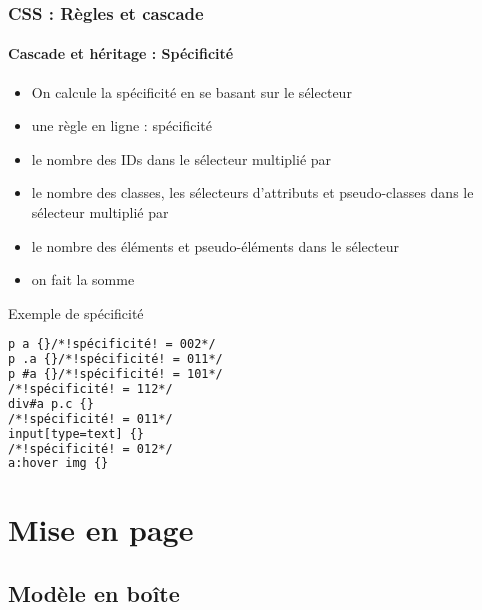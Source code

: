 \documentclass[xcolor=table]{beamer}
\begin{document}
\begin{frame}[fragile]
\frametitle{CSS : Règles et cascade}
\framesubtitle{Cascade et héritage : Spécificité}

\begin{minipage}{0.60\textwidth}
	\begin{itemize}
		\item On calcule la spécificité en se basant sur le sélecteur
		\item une règle en ligne : spécificité  
		\item le nombre des IDs dans le sélecteur multiplié par 
		\item le nombre des classes, les sélecteurs d'attributs et pseudo-classes dans le sélecteur multiplié par 
		\item le nombre des éléments et pseudo-éléments dans le sélecteur
		\item on fait la somme
	\end{itemize}
\end{minipage}
%
\begin{minipage}{0.38\textwidth}
\begin{exampleblock}{Exemple de spécificité}
\lstset{escapeinside=!!}
\scriptsize\bfseries
\begin{lstlisting}[language={html}]
p a {}/*!spécificité! = 002*/
p .a {}/*!spécificité! = 011*/
p #a {}/*!spécificité! = 101*/
/*!spécificité! = 112*/
div#a p.c {}
/*!spécificité! = 011*/
input[type=text] {}
/*!spécificité! = 012*/
a:hover img {}
\end{lstlisting}
\end{exampleblock}
\end{minipage}
\end{frame}

\section{Mise en page}

\subsection{Modèle en boîte}
\end{document}
